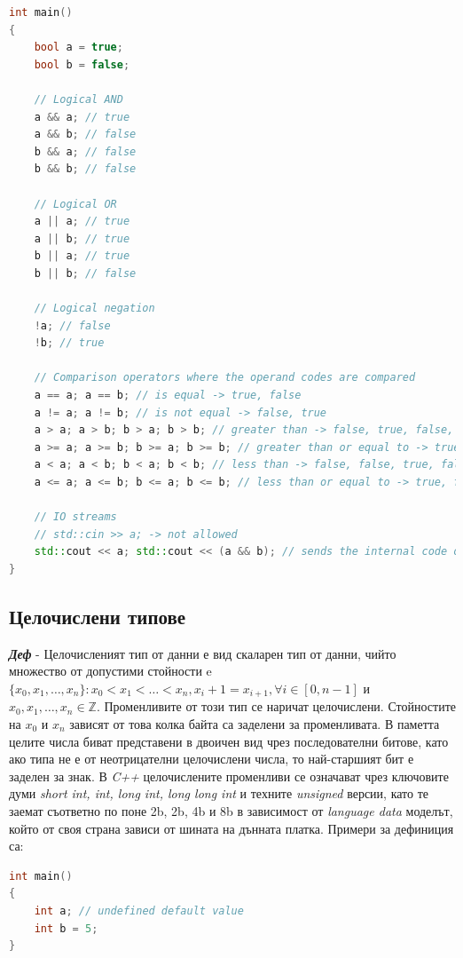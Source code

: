 \documentclass[fleqn,12pt]{article}
\begin{document}
\begin{flushleft}
\begin{lstlisting}[language=C++, caption=Bool operators]
int main()
{
    bool a = true;
    bool b = false;

    // Logical AND
    a && a; // true
    a && b; // false
    b && a; // false
    b && b; // false

    // Logical OR
    a || a; // true
    a || b; // true
    b || a; // true
    b || b; // false

    // Logical negation
    !a; // false
    !b; // true

    // Comparison operators where the operand codes are compared
    a == a; a == b; // is equal -> true, false
    a != a; a != b; // is not equal -> false, true
    a > a; a > b; b > a; b > b; // greater than -> false, true, false, false
    a >= a; a >= b; b >= a; b >= b; // greater than or equal to -> true, true, false, true
    a < a; a < b; b < a; b < b; // less than -> false, false, true, false
    a <= a; a <= b; b <= a; b <= b; // less than or equal to -> true, false, true, true

    // IO streams
    // std::cin >> a; -> not allowed
    std::cout << a; std::cout << (a && b); // sends the internal code of the boolean expression to the stdout fd -> 1, 0
}
\end{lstlisting}

\subsection{Целочислени типове}

\textit{\textbf{Деф}} - Целочисленият тип от данни е вид скаларен тип от данни, чийто множество от допустими стойности e $\{x_0, x_1, \dots, x_n\}: x_0 < x_1 < \dots < x_n, x_i + 1 = x_{i+1}, \forall i \in [0, n-1]$ и $x_0, x_1, \dots, x_n \in \mathbb{Z}$.
Променливите от този тип се наричат целочислени. Стойностите на $x_0$ и $x_n$ зависят от това колка байта са заделени за променливата.
В паметта целите числа биват представени в двоичен вид чрез последователни битове, като ако типа не е от неотрицателни целочислени числа, то най-старшият бит е заделен за знак.
\bigbreak
В \textit{C++} целочислените променливи се означават чрез ключовите думи \textit{short int, int, long int, long long int} и техните \textit{unsigned} версии, като те заемат съответно по поне 2b, 2b, 4b и 8b в зависимост от \textit{language data} моделът, който от своя страна зависи от шината на дънната платка. Примери за дефиниция са:

\begin{lstlisting}[language=C++, caption=Integer variables]
int main()
{
    int a; // undefined default value
    int b = 5;
}
\end{lstlisting}


\end{flushleft}
\end{document}
